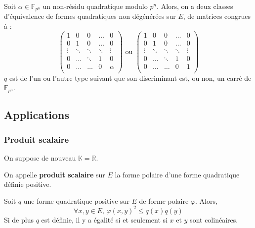 	\begin{theorem}
		Soit $\alpha \in \mathbb{F}_{p^n}$ un non-résidu quadratique modulo $p^n$. Alors, on a deux classes d'équivalence de formes quadratiques non dégénérées sur $E$, de matrices congrues à :
		\[
			\begin{pmatrix}
				1 & 0 & 0 & \dots & 0 \\
				0 & 1 & 0 & \dots & 0 \\
				\vdots & \ddots & \ddots & \ddots & \vdots \\
				0 & \dots & \ddots & 1 & 0 \\
				0 & \dots & \dots & 0 & \alpha \\
			\end{pmatrix}
			\text{ ou }
			\begin{pmatrix}
				1 & 0 & 0 & \dots & 0 \\
				0 & 1 & 0 & \dots & 0 \\
				\vdots & \ddots & \ddots & \ddots & \vdots \\
				0 & \dots & \ddots & 1 & 0 \\
				0 & \dots & \dots & 0 & 1 \\
			\end{pmatrix}
		\]
		$q$ est de l'un ou l'autre type suivant que son discriminant est, ou non, un carré de $\mathbb{F}_{p^n}$.
	\end{theorem}
	
	\subsection{Applications}
	
	\subsubsection{Produit scalaire}
	
	On suppose de nouveau $\mathbb{K} = \mathbb{R}$.
	
	
	\begin{definition}
		On appelle \textbf{produit scalaire} sur $E$ la forme polaire d'une forme quadratique définie positive.
	\end{definition}
	
	
	\begin{proposition}
		Soit $q$ une forme quadratique positive sur $E$ de forme polaire $\varphi$. Alors,
		\[ \forall x, y \in E, \, \varphi(x, y)^2 \leq q(x) q(y) \]
		Si de plus $q$ est définie, il y a égalité si et seulement si $x$ et $y$ sont colinéaires.
	\end{proposition}
	
